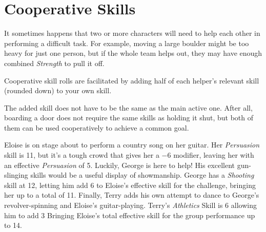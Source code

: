 \section{Cooperative Skills}
It sometimes happens that two or more characters will need to help each other in performing a difficult task.
For example, moving a large boulder might be too heavy for just one person, but if the whole team helps out, they may have enough combined \textit{Strength} to pull it off.

Cooperative skill rolls are facilitated by adding half of each helper's relevant skill (rounded down) to your own skill.

\note The added skill does not have to be the same as the main active one. 
After all, boarding a door does not require the same skills as holding it shut, but both of them can be used cooperatively to achieve a common goal.

\example
Eloise is on stage about to perform a country song on her guitar.
Her \textit{Persuasion} skill is 11, but it's a tough crowd that gives her a $-6$ modifier, leaving her with an effective \textit{Persuasion} of 5.
Luckily, George is here to help!
His excellent gun-slinging skills would be a useful display of showmanship.
George has a \textit{Shooting} skill at 12, letting him add 6 to Eloise's effective skill for the challenge, bringing her up to a total of 11.
Finally, Terry adds his own attempt to dance to George's revolver-spinning and Eloise's guitar-playing. 
Terry's \textit{Athletics} Skill is 6 allowing him to add 3 Bringing Eloise's total effective skill for the group performance up to 14.
